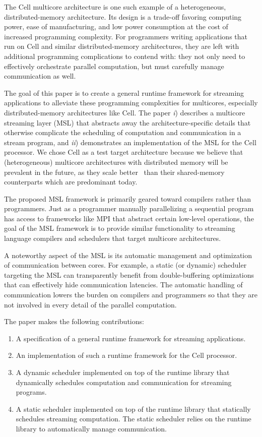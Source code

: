 The Cell multicore architecture is one such example of a heterogeneous, 
distributed-memory architecture. Its design
is a trade-off favoring computing power, ease of manufacturing, and
low power consumption at the cost of increased programming
complexity. For programmers writing applications that run on Cell and
similar distributed-memory architectures, they are left with
additional programming complications to contend with: they not only
need to effectively orchestrate parallel computation, but must
carefully manage communication as well.

The goal of this paper is to create a general runtime framework for
streaming applications to alleviate these programming complexities for
multicores, especially distributed-memory architectures like Cell. The
paper \emph{i}) describes a multicore streaming layer (MSL) that abstracts
away the architecture-specific details that otherwise complicate the
scheduling of computation and communication in a stream program, and
\emph{ii}) demonstrates an implementation of the MSL for the Cell
processor. We chose Cell as a test target architecture because we
believe that (heterogeneous) multicore architectures with distributed
memory will be prevalent in the future, as they scale
better~\cite{theo-phd-07} than their shared-memory counterparts which
are predominant today.

The proposed MSL framework is primarily geared toward compilers rather
than programmers. Just as a programmer manually parallelizing a
sequential program has access to frameworks like MPI that abstract
certain low-level operations, the goal of the MSL framework is
to provide similar functionality to streaming language compilers and
schedulers that target multicore architectures. 

A noteworthy aspect of the MSL is its automatic management and
optimization of communication between cores. For example, a static (or
dynamic) scheduler targeting the MSL can transparently benefit from
double-buffering optimizations that can effectively hide communication
latencies. The automatic handling of communication lowers the burden
on compilers and programmers so that they are not involved in every
detail of the parallel computation.

The paper makes the following contributions:
\begin{enumerate}
\item A specification of a general runtime framework for streaming applications.
\item An implementation of such a runtime framework for the Cell processor.
\item A dynamic scheduler implemented on top of the runtime library
  that dynamically schedules computation and communication for
  streaming programs.
\item A static scheduler implemented on top of the runtime library
  that statically schedules streaming computation. The static
  scheduler relies on the runtime library to automatically manage
  communication.
\end{enumerate}

